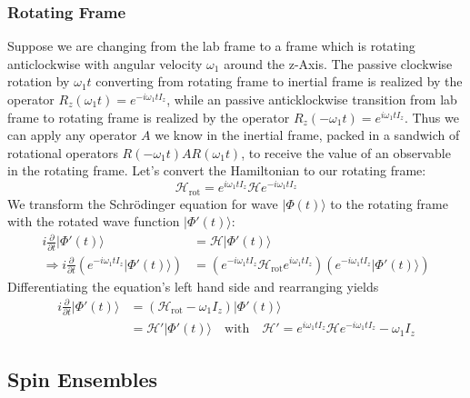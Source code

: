 \documentclass[11.5pt,a4paper]{article}
\begin{document}
\subsubsection{Rotating Frame}
Suppose we are changing from the lab frame to a frame which is rotating anticlockwise with angular velocity $\omega_1$ around the z-Axis. 
The passive clockwise rotation by $\omega_1 t$ converting from rotating frame to inertial frame is realized by the operator $R_z(\omega_1 t) = e^{-i \omega_1 t I_z}$, while an passive anticklockwise transition from lab frame to rotating frame is realized by the operator $R_z(-\omega_1 t) =  e^{i \omega_1 t I_z}$. Thus we can apply any operator $A$ we know in the inertial frame, packed in a sandwich of rotational operators $R(-\omega_1 t) A R(\omega_1 t)$, to receive the value of an observable in the rotating frame. Let's convert the Hamiltonian to our rotating frame:
\begin{equation}
 \mathcal{H}_\text{rot} = e^{i \omega_1 t I_z} \mathcal{H} e^{-i \omega_1 t I_z}
\end{equation}
We transform the Schr\"odinger equation for wave $|\Phi(t)\rangle$ to the rotating frame with the rotated wave function $|\Phi'(t)\rangle$:
\begin{align} 
  i\frac{\partial}{\partial t} |\Phi'(t)\rangle   & = \mathcal{H} |\Phi'(t)\rangle  \\
  \Rightarrow i \frac{\partial}{\partial t} \left(e^{-i \omega_1 t I_z} |\Phi'(t)\rangle \right) & = \left( e^{-i \omega_1 t I_z} \mathcal{H}_\text{rot} e^{i \omega_1 t I_z} \right) \left( e^{-i \omega_1 t I_z} |\Phi'(t)\rangle \right)
\end{align}
Differentiating the equation's left hand side and rearranging yields
\begin{align}
 i\frac{\partial}{\partial t} |\Phi'(t)\rangle & = (\mathcal{H}_\text{rot} - \omega_1 I_z) |\Phi'(t)\rangle \\
  & = \mathcal{H}' |\Phi'(t)\rangle \quad \text{with} \quad \mathcal{H}' = e^{i \omega_1 t I_z} \mathcal{H} e^{-i \omega_1 t I_z} - \omega_1 I_z
  \label{eq-rotating-hamiltonian}
\end{align}

\subsection{Spin Ensembles}
\end{document}
